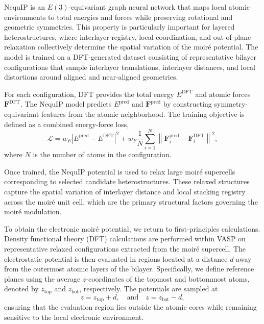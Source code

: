 \documentclass[aps, preprint, prb,]{revtex4-2}
\begin{document}
NequIP is an $E(3)$-equivariant graph neural network that maps local atomic environments to total energies and forces while preserving rotational and geometric symmetries. This property is particularly important for layered heterostructures, where interlayer registry, local coordination, and out-of-plane relaxation collectively determine the spatial variation of the moir\'e potential. The model is trained on a DFT-generated dataset consisting of representative bilayer configurations that sample interlayer translations, interlayer distances, and local distortions around aligned and near-aligned geometries.

For each configuration, DFT provides the total energy $E^{\mathrm{DFT}}$ and atomic forces $\mathbf{F}^{\mathrm{DFT}}$. The NequIP model predicts $E^{\mathrm{pred}}$ and $\mathbf{F}^{\mathrm{pred}}$ by constructing symmetry-equivariant features from the atomic neighborhood. The training objective is defined as a combined energy-force loss,
\begin{equation}
\mathcal{L} =
w_E \left| E^{\mathrm{pred}} - E^{\mathrm{DFT}} \right|^2
+
w_F \frac{1}{N}\sum_{i=1}^{N}
\left\| \mathbf{F}_i^{\mathrm{pred}} - \mathbf{F}_i^{\mathrm{DFT}} \right\|^2,
\end{equation}
where $N$ is the number of atoms in the configuration.

Once trained, the NequIP potential is used to relax large moir\'e supercells corresponding to selected candidate heterostructures. These relaxed structures capture the spatial variation of interlayer distance and local stacking registry across the moir\'e unit cell, which are the primary structural factors governing the moir\'e modulation.

To obtain the electronic moir\'e potential, we return to first-principles calculations. Density functional theory (DFT) calculations are performed within VASP \cite{Kresse1996VASP} on representative relaxed configurations extracted from the moir\'e supercell. The electrostatic potential is then evaluated in regions located at a distance $d$ away from the outermost atomic layers of the bilayer. Specifically, we define reference planes using the average $z$-coordinates of the topmost and bottommost atoms, denoted by $z_{\mathrm{top}}$ and $z_{\mathrm{bot}}$, respectively. The potentials are sampled at
\begin{equation}
z = z_{\mathrm{top}} + d, \quad \text{and} \quad z = z_{\mathrm{bot}} - d,
\end{equation}
ensuring that the evaluation region lies outside the atomic cores while remaining sensitive to the local electronic environment.
\end{document}
